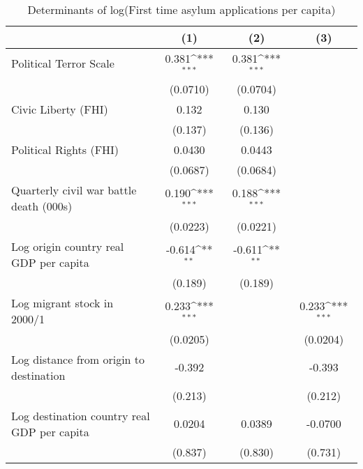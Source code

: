 \begin{table}[htbp]\centering
\def\sym#1{\ifmmode^{#1}\else\(^{#1}\)\fi}
\caption{Determinants of log(First time asylum applications per capita)}
\begin{tabular}{l*{3}{c}}
\hline\hline
                    &\multicolumn{1}{c}{(1)}         &\multicolumn{1}{c}{(2)}         &\multicolumn{1}{c}{(3)}         \\
\hline
Political Terror Scale&       0.381\sym{***}&       0.381\sym{***}&                     \\
                    &    (0.0710)         &    (0.0704)         &                     \\
[1em]
Civic Liberty (FHI) &       0.132         &       0.130         &                     \\
                    &     (0.137)         &     (0.136)         &                     \\
[1em]
Political Rights (FHI)&      0.0430         &      0.0443         &                     \\
                    &    (0.0687)         &    (0.0684)         &                     \\
[1em]
Quarterly civil war battle death (000s)&       0.190\sym{***}&       0.188\sym{***}&                     \\
                    &    (0.0223)         &    (0.0221)         &                     \\
[1em]
Log origin country real GDP per capita&      -0.614\sym{**} &      -0.611\sym{**} &                     \\
                    &     (0.189)         &     (0.189)         &                     \\
[1em]
Log migrant stock in 2000/1&       0.233\sym{***}&                     &       0.233\sym{***}\\
                    &    (0.0205)         &                     &    (0.0204)         \\
[1em]
Log distance from origin to destination&      -0.392         &                     &      -0.393         \\
                    &     (0.213)         &                     &     (0.212)         \\
[1em]
Log destination country real GDP per capita&      0.0204         &      0.0389         &     -0.0700         \\
                    &     (0.837)         &     (0.830)         &     (0.731)         \\

\end{tabular}
\end{table}
